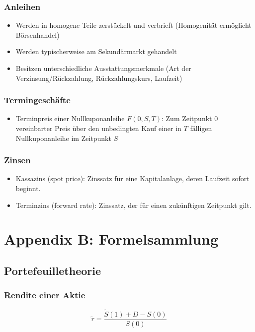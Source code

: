 \subsubsection{Anleihen}
\begin{itemize}
	\item Werden in homogene Teile zerstückelt und verbrieft (Homogenität ermöglicht Börsenhandel)
	\item Werden typischerweise am Sekundärmarkt gehandelt
	\item Besitzen unterschiedliche Ausstattungsmerkmale (Art der Verzinsung/Rückzahlung, Rückzahlungskurs, Laufzeit)
\end{itemize}

\subsubsection{Termingeschäfte}
\begin{itemize}
	\item Terminpreis einer Nullkuponanleihe \(F(0, S, T)\): Zum Zeitpunkt \(0\) vereinbarter Preis über den unbedingten Kauf einer in \(T\) fälligen Nullkuponanleihe im Zeitpunkt \(S\)
\end{itemize}

\subsubsection{Zinsen}
\begin{itemize}
	\item Kassazins (spot price): Zinssatz für eine Kapitalanlage, deren Laufzeit sofort beginnt.
	\item Terminzins (forward rate): Zinssatz, der für einen zukünftigen Zeitpunkt gilt.
\end{itemize}



\section{Appendix B: Formelsammlung}

\subsection{Portefeuilletheorie}

\subsubsection{Rendite einer Aktie}
\[\tilde{r} = \frac{\tilde{S} (1) + D - S(0)}{S(0)}\]

